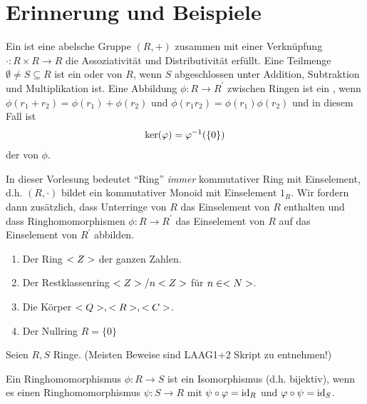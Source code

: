 \section{Erinnerung und Beispiele}

\begin{erinnerung}
	Ein  ist eine abelsche Gruppe $(R,+)$ zusammen mit einer Verknüpfung $\cdot : R\times R \to R$ die Assoziativität und Distributivität erfüllt. Eine Teilmenge $\emptyset \neq S \subseteq R$ ist ein  oder  von $R$, wenn $S$ abgeschlossen unter Addition, Subtraktion und Multiplikation ist. Eine Abbildung $\phi : R \to R^{'}$ zwischen Ringen ist ein , wenn $\phi(r_1 + r_2) = \phi(r_1) + \phi(r_2) \text{ und } \phi(r_1 r_2) = \phi(r_1) \phi(r_2)$ und in diesem Fall ist
	\begin{align}
		\ker(\phi)=\phi^{-1}(\{0\}) \notag
	\end{align}
	der  von $\phi$.
\end{erinnerung}

\begin{remark}
	In dieser Vorlesung bedeutet ``Ring'' \emph{immer} kommutativer Ring mit Einselement, d.h. $(R,\cdot)$ bildet ein kommutativer Monoid mit Einselement $1_R$. Wir fordern dann zusätzlich, dass Unterringe von $R$ das Einselement von $R$ enthalten und dass Ringhomomorphismen $\phi : R \to R^{'}$ das Einselement von $R$ auf das Einselement von $R^{'}$ abbilden.
\end{remark}

\begin{example}
	\begin{enumerate}
		\item Der Ring $\whole$ der ganzen Zahlen.
		\item Der Restklassenring $\whole / n \whole$ für $n \in \natur$.
		\item Die Körper $\ratio, \real, \comp$.
		\item Der Nullring $R = \{0\}$
	\end{enumerate}
\end{example}

Seien $R, S$ Ringe. (Meisten Beweise sind LAAG1+2 Skript zu entnehmen!)

\begin{proposition}
	Ein Ringhomomorphismus $\phi: R \to S$ ist ein Isomorphismus (d.h. bijektiv), wenn es einen Ringhomomorphismus $\psi: S \to R$ mit $\psi \circ \phi = \id_R$ und $\phi \circ \psi = \id_{S}$.
\end{proposition}

